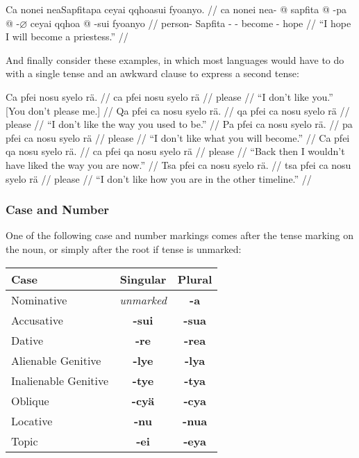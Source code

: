\documentclass{article}
\begin{document}
\ex[lingstyle=QuCheanya,tag=hope] \begingl
\glpreamble Ca nonei neaSapfitapa ceyai qqhoasui fyoanyo. //
\gla ca nonei nea- @ sapfita @ -pa @ -$\varnothing$ ceyai qqhoa @ -sui fyoanyo //
\glb {}  person- Sapfita - - become  - hope //
\glft ``I hope I will become a priestess.'' //
\endgl \xe

And finally consider these examples, in which most languages would have to do with a single tense and an awkward clause to express a second tense:

\pex[lingstyle=QuCheanya]
\a
\begingl
\glpreamble Ca pfei nosu syelo r\"a. //
\gla ca pfei nosu syelo r\"a //
\glb {}   please  //
\glft ``I don't like you.'' [You don't please me.] //
\endgl
\a
\begingl
\glpreamble Qa pfei ca nosu syelo r\"a. //
\gla qa pfei ca nosu syelo r\"a //
\glb {}    please  //
\glft ``I don't like the way you used to be.'' //
\endgl
\a
\begingl
\glpreamble Pa pfei ca nosu syelo r\"a. //
\gla pa pfei ca nosu syelo r\"a //
\glb {}    please  //
\glft ``I don't like what you will become.'' //
\endgl
\a
\begingl
\glpreamble Ca pfei qa nosu syelo r\"a. //
\gla ca pfei qa nosu syelo r\"a //
\glb {}    please  //
\glft ``Back then I wouldn't have liked the way you are now.'' //
\endgl
\a
\begingl
\glpreamble Tsa pfei ca nosu syelo r\"a. //
\gla tsa pfei ca nosu syelo r\"a //
\glb {}    please  //
\glft ``I don't like how you are in the other timeline.'' //
\endgl
\xe

\subsubsection{Case and Number}

One of the following case and number markings comes after the tense marking on the noun, or simply after the root if tense is unmarked:

\begin{table}[h]
\begin{tabular}{l| c c}
Case & Singular & Plural \\
\hline
Nominative & \emph{unmarked} & \textbf{-a} \\
Accusative & \textbf{-sui} & \textbf{-sua} \\
Dative & \textbf{-re} & \textbf{-rea} \\
Alienable Genitive & \textbf{-lye} & \textbf{-lya} \\
Inalienable Genitive & \textbf{-tye} & \textbf{-tya} \\
Oblique & \textbf{-cy\"a} & \textbf{-cya} \\
Locative & \textbf{-nu} & \textbf{-nua} \\
Topic & \textbf{-ei} & \textbf{-eya} \\
\end{tabular}
\end{table}
\end{document}
